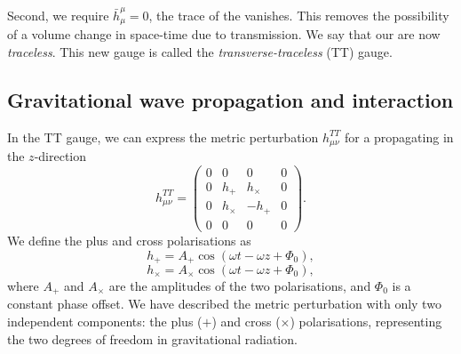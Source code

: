 Second, we require $\bar{h}^{\mu}_{\mu} = 0$, the trace of the \gw vanishes. This removes the possibility of a volume change in space-time due to \gwadj transmission. We say that our \gws are now \textit{traceless}. This new gauge is called the \textit{transverse-traceless} (TT) gauge.

\subsection{\label{1:sec:gravitational-propagation}Gravitational wave propagation and interaction}

In the TT gauge, we can express the metric perturbation $h^{TT}_{\mu\nu}$ for a \gw propagating in the $z$-direction
%
\begin{equation}
   h^{TT}_{\mu \nu} =
   \begin{pmatrix}
      0 & 0 & 0 & 0 \\
      0 & h_+ & h_\times & 0 \\
      0 & h_\times & -h_+ & 0 \\
      0 & 0 & 0 & 0
   \end{pmatrix}.
   \label{1:eqn:h_TT}
\end{equation}
%
We define the plus and cross polarisations as
%
\begin{equation}
    h_+ = A_+ \cos(\omega t - \omega z + \Phi_{0}),
\end{equation}
%
\begin{equation}
    h_{\times} = A_{\times} \cos(\omega t - \omega z + \Phi_{0}),
\end{equation}
%
where $A_+$ and $A_\times$ are the amplitudes of the two polarisations, and $\Phi_{0}$ is a constant phase offset. We have described the metric perturbation with only two independent components: the plus ($+$) and cross ($\times$) polarisations, representing the two degrees of freedom in gravitational radiation.

